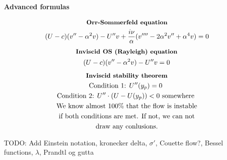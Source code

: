 \documentclass[10pt, a4paper]{article}
\begin{document}
\begin{center}
    \Large
    \textbf{Advanced formulas}
    \vspace{0.5cm}
\end{center}
\begin{multicols*}{2}
    \begin{gather*}
        \textbf{\small Orr-Sommerfeld equation} \\
        (U - c)(v''-\alpha^2 v) - U''v + \frac{i\nu}{\alpha}(v''''-2\alpha^2v''+\alpha^4v) = 0
    \end{gather*}
    \begin{gather*}
        \textbf{\small Inviscid OS (Rayleigh) equation} \\
        (U - c)(v''-\alpha^2 v) - U''v = 0
    \end{gather*}
    \begin{gather*}
        \textbf{\small Inviscid stability theorem} \\
        \text{Condition 1: $U''(y_p) = 0$ } \\
        \text{Condition 2: $U''\cdot(U-U(y_p)) < 0$ somewhere } \\
        \text{We know almost 100\% that the flow is instable}\\
        \text{if both conditions are met. If not, we can not} \\
        \text{draw any conlusions.}
    \end{gather*}
\end{multicols*}

TODO: Add Einstein notation, kronecker delta, $\sigma '$, Couette flow?, Bessel functions, $\lambda$, Prandtl og gutta
\end{document}
